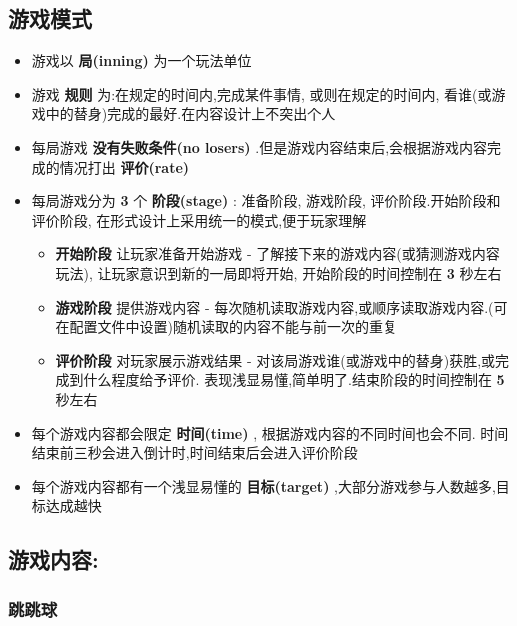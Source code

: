 \documentclass[11pt]{article}
\providecommand{\tightlist}{%
      \setlength{\itemsep}{0pt}\setlength{\parskip}{0pt}}
\begin{document}
    \subsection{游戏模式}\label{ux6e38ux620fux6a21ux5f0f}

    \begin{itemize}
\tightlist
\item
  游戏以 \textbf{局(inning)} 为一个玩法单位
\item
  游戏 \textbf{规则} 为:在规定的时间内,完成某件事情, 或则在规定的时间内,
  看谁(或游戏中的替身)完成的最好.在内容设计上不突出个人
\item
  每局游戏 \textbf{没有失败条件(no losers)}
  .但是游戏内容结束后,会根据游戏内容完成的情况打出 \textbf{评价(rate)}
\item
  每局游戏分为 \textbf{3} 个 \textbf{阶段(stage)} : 准备阶段, 游戏阶段,
  评价阶段.开始阶段和评价阶段, 在形式设计上采用统一的模式,便于玩家理解

  \begin{itemize}
  \tightlist
  \item
    \textbf{开始阶段} 让玩家准备开始游戏 -
    了解接下来的游戏内容(或猜测游戏内容玩法),
    让玩家意识到新的一局即将开始, 开始阶段的时间控制在 \textbf{3} 秒左右
  \item
    \textbf{游戏阶段} 提供游戏内容 -
    每次随机读取游戏内容,或顺序读取游戏内容.(可在配置文件中设置)随机读取的内容不能与前一次的重复
  \item
    \textbf{评价阶段} 对玩家展示游戏结果 -
    对该局游戏谁(或游戏中的替身)获胜,或完成到什么程度给予评价.
    表现浅显易懂,简单明了.结束阶段的时间控制在 \textbf{5} 秒左右
  \end{itemize}
\item
  每个游戏内容都会限定 \textbf{时间(time)} ,
  根据游戏内容的不同时间也会不同.
  时间结束前三秒会进入倒计时,时间结束后会进入评价阶段
\item
  每个游戏内容都有一个浅显易懂的 \textbf{目标(target)}
  ,大部分游戏参与人数越多,目标达成越快
\end{itemize}

    \subsection{游戏内容:}\label{ux6e38ux620fux5185ux5bb9}

    \subsubsection{跳跳球}\label{ux8df3ux8df3ux7403}
\end{document}
